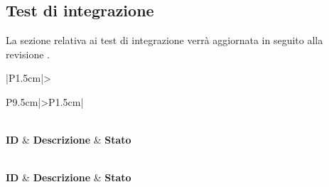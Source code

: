 \subsection{Test di integrazione}

\par La sezione relativa ai test di integrazione verrà aggiornata in seguito alla revisione .

\bgroup
\begin{adjustwidth}{-0.5cm}{-0.5cm}
 	\begin{longtable}{|P{1.5cm}|>{\raggedright}P{9.5cm}|>{\arraybackslash}P{1.5cm}|}
		\caption{Test di integrazione}
  	\label{tab:test-integrazione} \\
	  \hline
		\textbf{ID} & \textbf{Descrizione} & \textbf{Stato} \\ 
		\hline
		\endfirsthead

		\caption[]{Test di integrazione (continua)} \\
		\hline
		\textbf{ID} & \textbf{Descrizione} & \textbf{Stato} \\ 
		\hline
		\endhead

		\hline
		 \\ 
		\hline
		\endfoot

		\hline
		\endlastfoot


\end{longtable}
\end{adjustwidth}
